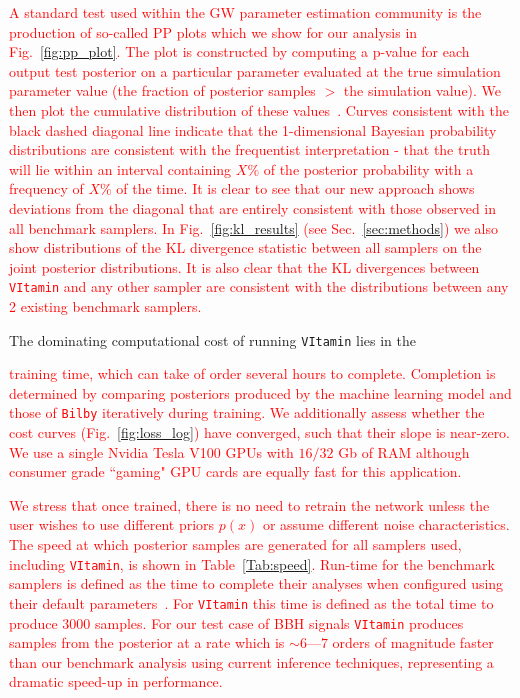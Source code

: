 
%
%

\textcolor{red}{
A standard test used within the \ac{GW} parameter estimation community is the
production of so-called \ac{PP} plots which we show for our analysis in
Fig.~\ref{fig:pp_plot}. The plot is constructed by computing a p-value for each
output test posterior on a particular parameter evaluated at the true
simulation parameter value (the fraction of posterior samples $>$ the
simulation value). We then plot the cumulative distribution of these
values~\cite{1409.7215}. Curves consistent with the black dashed diagonal line
indicate that the 1-dimensional Bayesian probability distributions are
consistent with the frequentist interpretation - that the truth will lie within
an interval containing $X\%$ of the posterior probability with a frequency of
$X\%$ of the time. It is clear to see that our new approach shows deviations
from the diagonal that are entirely consistent with those observed in all
benchmark samplers. In Fig.~\ref{fig:kl_results} (see Sec.~\ref{sec:methods})
we also show distributions of the \ac{KL} divergence statistic between all
samplers on the joint posterior distributions. It is also clear that the
\ac{KL} divergences between \texttt{VItamin} and any other sampler are
consistent with the distributions between any 2 existing benchmark samplers. 
}

%
%
The dominating computational cost of running \texttt{VItamin} lies in the \textcolor{red}{
training time, which can take of order several hours to complete.  Completion
is determined by comparing posteriors produced by the machine learning model
and those of \texttt{Bilby} iteratively during training. We additionally assess
whether the cost curves (Fig.~\ref{fig:loss_log}) have converged, such that 
their slope is near-zero. We use a 
single Nvidia Tesla V100 \acp{GPU} with $16/32$ Gb of RAM although consumer grade
``gaming" \ac{GPU} cards are equally fast for this application. 

We stress that
once trained, there is no need to retrain the network unless the user wishes to
use different priors $p(x)$ or assume different noise characteristics.   The
speed at which posterior samples are generated for all samplers used, including
\texttt{VItamin}, is shown in Table~\ref{Tab:speed}. Run-time for the benchmark
samplers is defined as the time to complete their analyses when configured
using their default parameters~\cite{1811.02042}. For \texttt{VItamin} this
time is defined as the total time to produce $3000$ samples. For our test case
of \ac{BBH} signals \texttt{VItamin} produces samples from the posterior at a
rate which is $\sim 6$---$7$ orders of magnitude faster than our benchmark analysis 
using current inference techniques, representing a dramatic speed-up in performance.}

